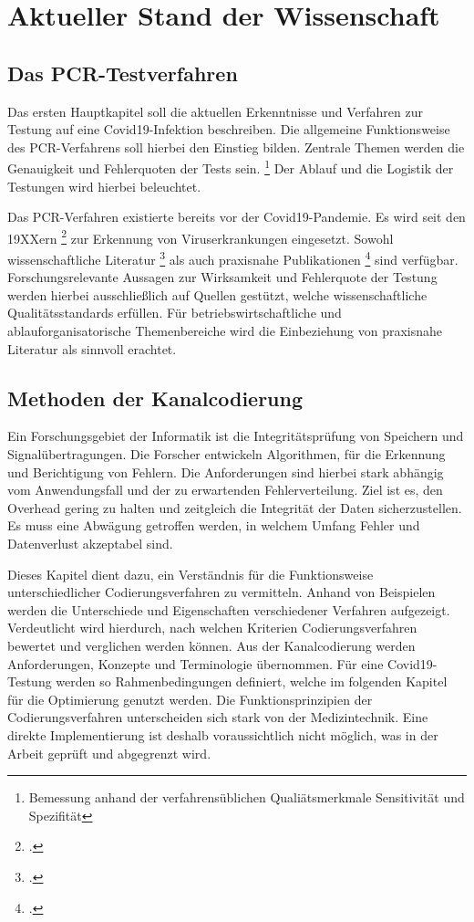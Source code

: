 
\chapter{Aktueller Stand der Wissenschaft}
\section{Das PCR-Testverfahren}
Das ersten Hauptkapitel soll die aktuellen Erkenntnisse und Verfahren zur Testung auf eine Covid19-Infektion beschreiben.
Die allgemeine Funktionsweise des PCR-Verfahrens soll hierbei den Einstieg bilden.
Zentrale Themen werden die Genauigkeit und Fehlerquoten der Tests sein.
\footnote{Bemessung anhand der verfahrensüblichen Qualiätsmerkmale Sensitivität und Spezifität}
Der Ablauf und die Logistik der Testungen wird hierbei beleuchtet.

Das PCR-Verfahren existierte bereits vor der Covid19-Pandemie.
Es wird seit den 19XXern
\footcite{Quelle erster Masseneinsatz PCR}
zur Erkennung von Viruserkrankungen eingesetzt.
Sowohl wissenschaftliche Literatur
\footcite{Wissenschaftlich PCR}
als auch praxisnahe Publikationen
\footcite{Praxishandbuch PCR}
sind verfügbar.
Forschungsrelevante Aussagen zur Wirksamkeit und Fehlerquote der Testung werden hierbei ausschließlich auf Quellen gestützt, welche wissenschaftliche Qualitätsstandards erfüllen.
Für betriebswirtschaftliche und ablauforganisatorische Themenbereiche wird die Einbeziehung von praxisnahe Literatur als sinnvoll erachtet.

\section{Methoden der Kanalcodierung}
Ein Forschungsgebiet der Informatik ist die Integritätsprüfung von Speichern und Signalübertragungen.
Die Forscher entwickeln Algorithmen, für die Erkennung und Berichtigung von Fehlern.
Die Anforderungen sind hierbei stark abhängig vom Anwendungsfall und der zu erwartenden Fehlerverteilung.
Ziel ist es, den Overhead gering zu halten und zeitgleich die Integrität der Daten sicherzustellen.
Es muss eine Abwägung getroffen werden, in welchem Umfang Fehler und Datenverlust akzeptabel sind.

Dieses Kapitel dient dazu, ein Verständnis für die Funktionsweise unterschiedlicher Codierungsverfahren zu vermitteln.
Anhand von Beispielen werden die Unterschiede und Eigenschaften verschiedener Verfahren aufgezeigt.
Verdeutlicht wird hierdurch, nach welchen Kriterien Codierungsverfahren bewertet und verglichen werden können.
Aus der Kanalcodierung werden Anforderungen, Konzepte und Terminologie übernommen.
Für eine Covid19-Testung werden so Rahmenbedingungen definiert, welche im folgenden Kapitel für die Optimierung genutzt werden.
Die Funktionsprinzipien der Codierungsverfahren unterscheiden sich stark von der Medizintechnik.
Eine direkte Implementierung ist deshalb voraussichtlich nicht möglich, was in der Arbeit geprüft und abgegrenzt wird.

